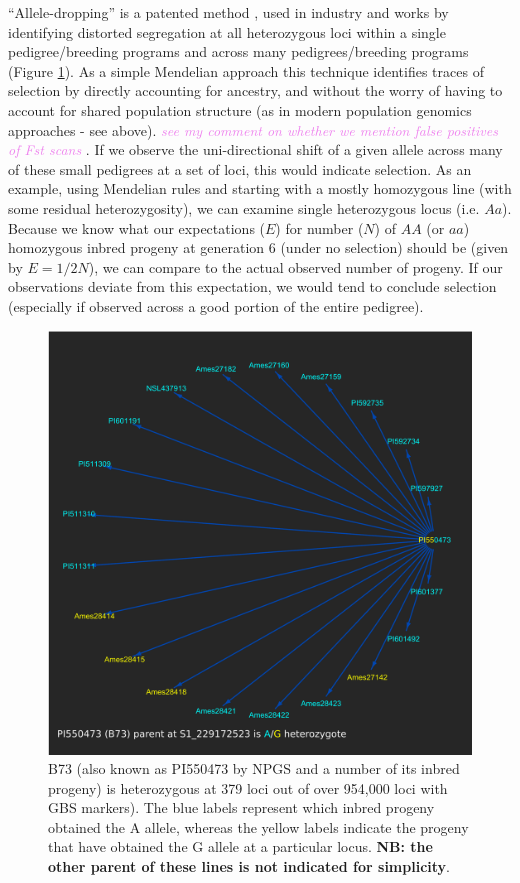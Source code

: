 \documentclass[draft,12pt]{article}
\newcommand{\kc}[1]{\textcolor{violet}{ \emph{\scriptsize  #1}} }
\begin{document}
``Allele-dropping'' is a patented method \cite{sebastian1995method}, used in industry and works by identifying distorted segregation at all heterozygous loci within a single pedigree/breeding programs and across many pedigrees/breeding programs (Figure \ref{fig:alleledrop}). 
As a simple Mendelian approach this technique identifies traces of selection by directly accounting for ancestry, and without the worry of having to account for shared population structure \cite{sebastian1995method} (as in modern population genomics approaches - see above).
\kc{see my comment on whether we mention false positives of Fst scans}. 
If we observe the uni-directional shift of a given allele across many of these small pedigrees at a set of loci, this would indicate selection.
As an example, using Mendelian rules and starting with a mostly homozygous line (with some residual heterozygosity), we can examine single heterozygous locus (i.e. $Aa$). 
Because we know what our expectations ($E$) for number ($N$) of $AA$ (or $aa$) homozygous inbred progeny at generation 6 (under no selection) should be (given by $E = 1/2 N$), we can compare to the actual observed number of progeny. 
If our observations deviate from this expectation, we would tend to conclude selection (especially if observed across a good portion of the entire pedigree). 

\begin{figure}[p]
\includegraphics[width=1.0\linewidth]{Pruned.pdf}
\caption{B73 (also known as PI550473 by NPGS and a number of its inbred progeny) is heterozygous at 379 loci out of over 954,000 loci with GBS markers). The blue labels represent which inbred progeny obtained the A allele, whereas the yellow labels indicate the progeny that have obtained the G allele at a particular locus. \textbf{NB: the other parent of these lines is not indicated for simplicity}.}
\label{fig:alleledrop}
\end{figure}
\end{document}
